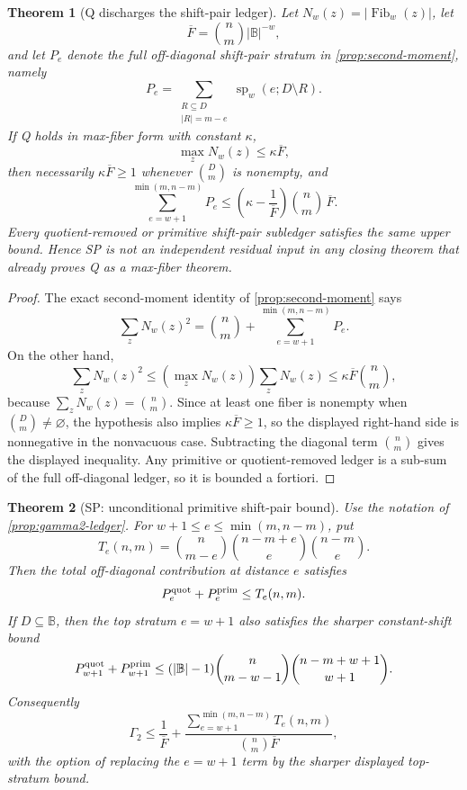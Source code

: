 \documentclass[a4paper,11pt]{amsart}
\newtheorem{theorem}{Theorem}[section]
\theoremstyle{remark}
\newcommand{\B}{\mathbb B}
\newcommand{\Fib}{\operatorname{Fib}}
\begin{document}
\begin{theorem}[Q discharges the shift-pair ledger]\label{thm:q-implies-sp}
Let \(N_w(z)=|\Fib_w(z)|\), let
\[
        \overline F=\binom nm |\B|^{-w},
\]
and let \(P_e\) denote the full off-diagonal shift-pair stratum in \cref{prop:second-moment}, namely
\[
        P_e=\sum_{\substack{R\subseteq D\\ |R|=m-e}}\operatorname{sp}_w(e;D\setminus R).
\]
If Q holds in max-fiber form with constant \(\kappa\),
\[
        \max_z N_w(z)\le \kappa\overline F,
\]
then necessarily \(\kappa\overline F\ge1\) whenever \(\binom Dm\) is nonempty, and
\[
        \sum_{e=w+1}^{\min(m,n-m)}P_e
        \le
        \left(\kappa-\frac{1}{\overline F}\right)\binom nm\,\overline F .
\]
Every quotient-removed or primitive shift-pair subledger satisfies the same upper bound.  Hence SP is not an independent residual input in any closing theorem that already proves Q as a max-fiber theorem.
\end{theorem}

\begin{proof}
The exact second-moment identity of \cref{prop:second-moment} says
\[
        \sum_z N_w(z)^2
        =\binom nm+
        \sum_{e=w+1}^{\min(m,n-m)}P_e .
\]
On the other hand,
\[
        \sum_zN_w(z)^2
        \le (\max_zN_w(z))\sum_zN_w(z)
        \le \kappa\overline F\binom nm,
\]
because \(\sum_zN_w(z)=\binom nm\).  Since at least one fiber is nonempty when \(\binom Dm\ne\varnothing\), the hypothesis also implies \(\kappa\overline F\ge1\), so the displayed right-hand side is nonnegative in the nonvacuous case.  Subtracting the diagonal term \(\binom nm\) gives the displayed inequality.  Any primitive or quotient-removed ledger is a sub-sum of the full off-diagonal ledger, so it is bounded a fortiori.
\end{proof}

\begin{theorem}[SP: unconditional primitive shift-pair bound]\label{thm:sp-proper}
Use the notation of \cref{prop:gamma2-ledger}.  For \(w+1\le e\le\min(m,n-m)\), put
\[
        T_e(n,m)=\binom n{m-e}\binom{n-m+e}{e}\binom{n-m}{e}.
\]
Then the total off-diagonal contribution at distance \(e\) satisfies
\[
        P_e^{\rm quot}+P_e^{\rm prim}\le T_e(n,m).
\]
If \(D\subseteq\B\), then the top stratum \(e=w+1\) also satisfies the sharper constant-shift bound
\[
        P_{w+1}^{\rm quot}+P_{w+1}^{\rm prim}
        \le
        (|\B|-1)\binom n{m-w-1}\binom{n-m+w+1}{w+1}.
\]
Consequently
\[
        \Gamma_2
        \le
        \frac{1}{\overline F}
        +\frac{\sum_{e=w+1}^{\min(m,n-m)}T_e(n,m)}{\binom{n}{m}\overline F},
\]
with the option of replacing the \(e=w+1\) term by the sharper displayed top-stratum bound.
\end{theorem}
\end{document}
